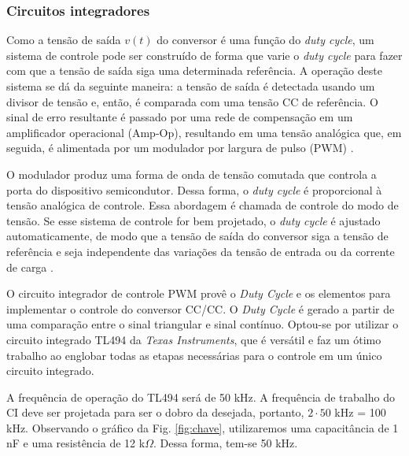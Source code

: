 \subsubsection*{Circuitos integradores}

Como a tensão de saída $v(t)$ do conversor é uma função do \textit{duty cycle}, um sistema de controle pode ser construído de forma que varie o \textit{duty cycle} para fazer com que a tensão de saída siga uma determinada referência. A operação deste sistema se dá da seguinte maneira: a tensão de saída é detectada usando um divisor de tensão e, então, é comparada com uma tensão CC de referência. O sinal de erro resultante é passado por uma rede de compensação em um amplificador operacional (Amp-Op), resultando em uma tensão analógica que, em seguida, é alimentada por um modulador por largura de pulso (PWM) \cite{forward}.

O modulador produz uma forma de onda de tensão comutada que controla a porta do dispositivo semicondutor. Dessa forma, o \textit{duty cycle} é proporcional à tensão analógica de controle. Essa abordagem é chamada de controle do modo de tensão. Se esse sistema de controle for bem projetado, o \textit{duty cycle} é ajustado automaticamente, de modo que a tensão de saída do conversor siga a tensão de referência e seja independente das variações da tensão de entrada ou da corrente de carga \cite{forward}.

O circuito integrador de controle PWM provê o \textit{Duty Cycle} e os elementos para implementar o controle do conversor CC/CC. O \textit{Duty Cycle} é gerado a partir de uma comparação entre o sinal triangular e sinal contínuo. Optou-se por utilizar o circuito integrado TL494 da \textit{Texas Instruments}, que é versátil e faz um ótimo trabalho ao englobar todas as etapas necessárias para o controle em um único circuito integrado.

A frequência de operação do TL494 será de 50 kHz. A frequência de trabalho do CI deve ser projetada para ser o dobro da desejada, portanto, $2 \cdot 50$ kHz = 100 kHz. Observando o gráfico da Fig. \ref{fig:chave}, utilizaremos uma capacitância de 1 nF e uma resistência de 12 k$\Omega$. Dessa forma, tem-se 50 kHz. 

